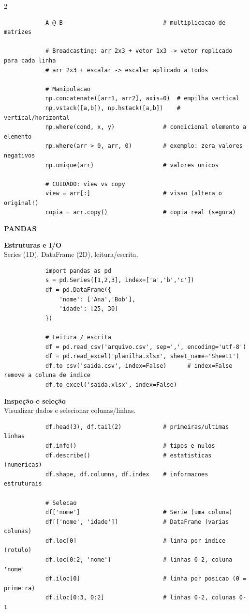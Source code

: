 \documentclass[a4paper]{article}
\begin{document}
\begin{multicols}{2}
\begin{lstlisting}
			A @ B                             # multiplicacao de matrizes
			
			# Broadcasting: arr 2x3 + vetor 1x3 -> vetor replicado para cada linha
			# arr 2x3 + escalar -> escalar aplicado a todos
			
			# Manipulacao
			np.concatenate([arr1, arr2], axis=0)  # empilha vertical
			np.vstack([a,b]), np.hstack([a,b])    # vertical/horizontal
			np.where(cond, x, y)              # condicional elemento a elemento
			np.where(arr > 0, arr, 0)         # exemplo: zera valores negativos
			np.unique(arr)                    # valores unicos
			
			# CUIDADO: view vs copy
			view = arr[:]                     # visao (altera o original!)
			copia = arr.copy()                # copia real (segura)
		\end{lstlisting}
		
		\vspace{0.2cm}
		{\large\bfseries PANDAS}
		
		\noindent\textbf{Estruturas e I/O} \\
		Series (1D), DataFrame (2D), leitura/escrita.
		\begin{lstlisting}
			import pandas as pd
			s = pd.Series([1,2,3], index=['a','b','c'])
			df = pd.DataFrame({
				'nome': ['Ana','Bob'],
				'idade': [25, 30]
			})
			
			# Leitura / escrita
			df = pd.read_csv('arquivo.csv', sep=',', encoding='utf-8')
			df = pd.read_excel('planilha.xlsx', sheet_name='Sheet1')
			df.to_csv('saida.csv', index=False)      # index=False remove a coluna de indice
			df.to_excel('saida.xlsx', index=False)
		\end{lstlisting}
		
		\noindent\textbf{Inspeção e seleção} \\
		Visualizar dados e selecionar colunas/linhas.
		\begin{lstlisting}
			df.head(3), df.tail(2)            # primeiras/ultimas linhas
			df.info()                         # tipos e nulos
			df.describe()                     # estatisticas (numericas)
			df.shape, df.columns, df.index    # informacoes estruturais
			
			# Selecao
			df['nome']                        # Serie (uma coluna)
			df[['nome', 'idade']]             # DataFrame (varias colunas)
			df.loc[0]                         # linha por indice (rotulo)
			df.loc[0:2, 'nome']               # linhas 0-2, coluna 'nome'
			df.iloc[0]                        # linha por posicao (0 = primeira)
			df.iloc[0:3, 0:2]                 # linhas 0-2, colunas 0-1
			

\end{lstlisting}
\end{multicols}
\end{document}
